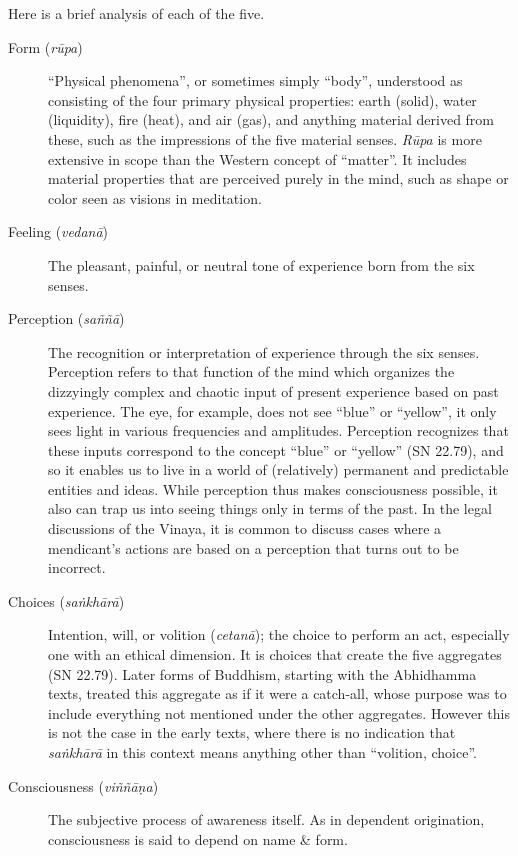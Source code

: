 \documentclass[12pt,openany]{book}%
\begin{document}
Here is a brief analysis of each of the five.

\begin{description}%
\item[Form (\textit{\textsanskrit{rūpa}})] “Physical phenomena”, or sometimes simply “body”, understood as consisting of the four primary physical properties: earth (solid), water (liquidity), fire (heat), and air (gas), and anything material derived from these, such as the impressions of the five material senses.
\textit{\textsanskrit{Rūpa}} is more extensive in scope than the Western concept of “matter”. It includes material properties that are perceived purely in the mind, such as shape or color seen as visions in meditation.%
\item[Feeling (\textit{\textsanskrit{vedanā}})] The pleasant, painful, or neutral tone of experience born from the six senses.%
\item[Perception (\textit{\textsanskrit{saññā}})] The recognition or interpretation of experience through the six senses.
Perception refers to that function of the mind which organizes the dizzyingly complex and chaotic input of present experience based on past experience. The eye, for example, does not see “blue” or “yellow”, it only sees light in various frequencies and amplitudes. Perception recognizes that these inputs correspond to the concept “blue” or “yellow” (SN 22.79), and so it enables us to live in a world of (relatively) permanent and predictable entities and ideas. While perception thus makes consciousness possible, it also can trap us into seeing things only in terms of the past. In the legal discussions of the Vinaya, it is common to discuss cases where a mendicant’s actions are based on a perception that turns out to be incorrect.%
\item[Choices (\textit{\textsanskrit{saṅkhārā}})] Intention, will, or volition (\textit{\textsanskrit{cetanā}}); the choice to perform an act, especially one with an ethical dimension. It is choices that create the five aggregates (SN 22.79).
Later forms of Buddhism, starting with the Abhidhamma texts, treated this aggregate as if it were a catch-all, whose purpose was to include everything not mentioned under the other aggregates. However this is not the case in the early texts, where there is no indication that \textit{\textsanskrit{saṅkhārā}} in this context means anything other than “volition, choice”.%
\item[Consciousness (\textit{\textsanskrit{viññāṇa}})] The subjective process of awareness itself.
As in dependent origination, consciousness is said to depend on name \& form.%
\end{description}
\end{document}

